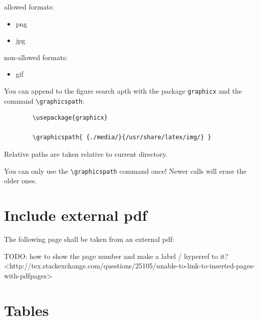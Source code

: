 \documentclass[12pt]{article}
\begin{document}
    allowed formats:

    \begin{itemize}
        \item png
        \item jpg
    \end{itemize}

    non-allowed formats:

    \begin{itemize}
        \item gif
    \end{itemize}

    You can append to the figure search apth with the package \lstinline|graphicx| and the command \lstinline|\graphicspath|:

    \begin{lstlisting}
        \usepackage{graphicx}

        \graphicspath{ {./media/}{/usr/share/latex/img/} }
    \end{lstlisting}

    Relative paths are taken relative to current directory.

    You can only use the \lstinline|\graphicspath| command once! Newer calls will erase the older ones.

%

\section{Include external pdf}\label{extPdf}

The following page shall be taken from an external pdf:



TODO: how to show the page number and make a label / hyperref to it?
<http://tex.stackexchange.com/questions/25105/unable-to-link-to-inserted-pages-with-pdfpages>

\section{Tables}\label{secTab}
\end{document}
